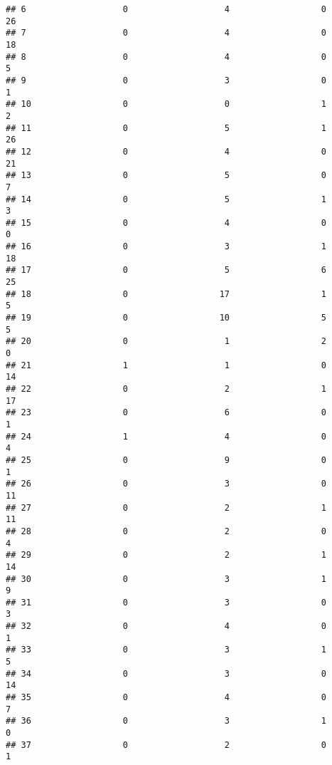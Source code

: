 \documentclass[
]{article}
\begin{document}
\begin{verbatim}
## 6                   0                   4                  0                26
## 7                   0                   4                  0                18
## 8                   0                   4                  0                 5
## 9                   0                   3                  0                 1
## 10                  0                   0                  1                 2
## 11                  0                   5                  1                26
## 12                  0                   4                  0                21
## 13                  0                   5                  0                 7
## 14                  0                   5                  1                 3
## 15                  0                   4                  0                 0
## 16                  0                   3                  1                18
## 17                  0                   5                  6                25
## 18                  0                  17                  1                 5
## 19                  0                  10                  5                 5
## 20                  0                   1                  2                 0
## 21                  1                   1                  0                14
## 22                  0                   2                  1                17
## 23                  0                   6                  0                 1
## 24                  1                   4                  0                 4
## 25                  0                   9                  0                 1
## 26                  0                   3                  0                11
## 27                  0                   2                  1                11
## 28                  0                   2                  0                 4
## 29                  0                   2                  1                14
## 30                  0                   3                  1                 9
## 31                  0                   3                  0                 3
## 32                  0                   4                  0                 1
## 33                  0                   3                  1                 5
## 34                  0                   3                  0                14
## 35                  0                   4                  0                 7
## 36                  0                   3                  1                 0
## 37                  0                   2                  0                 1

\end{verbatim}
\end{document}
